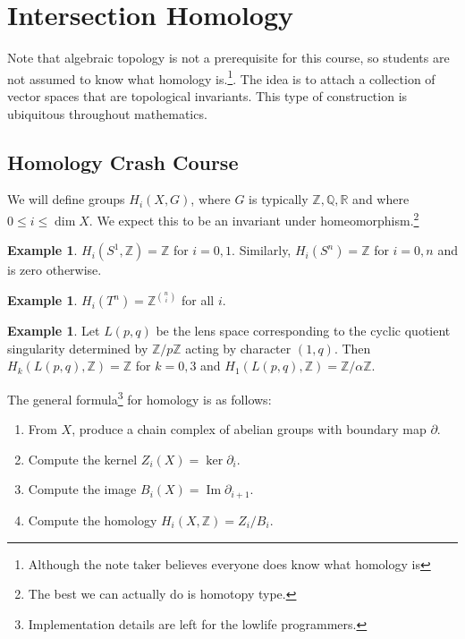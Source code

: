 \documentclass[leqno, openany]{memoir}
\theoremstyle{definition}
\newtheorem{exm}[thm]{Example}
\theoremstyle{remark}
\theoremstyle{plain}
\theoremstyle{definition}
\theoremstyle{remark}
\DeclareMathOperator{\Ima}{\mathrm{Im}}
\newcommand{\R}{\mathbb{R}}
\newcommand{\Z}{\mathbb{Z}}
\newcommand{\Q}{\mathbb{Q}}
\begin{document}
\section{Intersection Homology}%

Note that algebraic topology is not a prerequisite for this course, so students
are not assumed to know what homology is.\footnote{Although the note taker
believes everyone does know what homology is}. The idea is to attach a
collection of vector spaces that are topological invariants. This type of
construction is ubiquitous throughout mathematics.

\subsection{Homology Crash Course}%

We will define groups $H_i(X, G)$, where $G$ is typically $\Z, \Q, \R$ and
where $0 \leq i \leq \dim X$. We expect this to be an invariant under
homeomorphism.\footnote{The best we can actually do is homotopy type.}

\begin{exm} $H_i(S^1, \Z) = \Z$ for $i = 0,1$. Similarly, $H_i(S^n) = \Z$ for
$i = 0,n$ and is zero otherwise.  \end{exm}

\begin{exm} $H_i(T^n) = \Z^{\binom{n}{i}}$ for all $i$.  \end{exm}

\begin{exm} Let $L(p,q)$ be the lens space corresponding to the cyclic quotient
singularity determined by $\Z/p\Z$ acting by character $(1, q)$. Then
$H_k(L(p,q), \Z) = \Z$ for $k = 0,3$ and $H_1(L(p,q), \Z) = \Z/\alpha \Z$.
\end{exm}

The general formula\footnote{Implementation details are left for the lowlife
programmers.} for homology is as follows: \begin{enumerate} \item From $X$,
    produce a chain complex of abelian groups with boundary map $\partial$.
\item Compute the kernel $Z_i(X) = \ker \partial_i$.  \item Compute the image
$B_i(X) = \Ima \partial_{i+1}$.  \item Compute the homology $H_i(X, \Z) = Z_i /
B_i$.  \end{enumerate}
\end{document}
